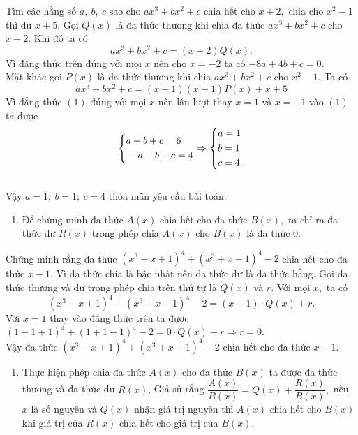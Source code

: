 \begin{vd} %
	Tìm các hằng số $a,\ b,\ c$ sao cho $ax^3+bx^2+c$ chia hết cho $x+2,$ chia cho $x^2-1$ thì dư $x+5.$
	\loigiai
	{
Gọi $Q(x)$ là đa thức thương khi chia đa thức $ax^3+bx^2+c$ cho $x+2.$ Khi đó ta có
\[ax^3+bx^2+c=(x+2)Q(x).\] Vì đẳng thức trên đúng với mọi $x$ nên cho $x=-2$ ta có $-8a+4b+c=0.$\\
Mặt khác gọi $P(x)$ là đa thức thương khi chia $ax^3+bx^2+c$ cho $x^2-1.$ Ta có \[ax^3+bx^2+c=(x+1)(x-1)P(x)+x+5\tag{1} \] Vì đẳng thức $(1)$ đúng với mọi $x$ nên lần lượt thay $x=1$ và $x=-1$ vào $(1)$ ta được \[\left\{\begin{aligned}&a+b+c=6\\&-a+b+c=4\end{aligned}\right.\Rightarrow\left\{\begin{aligned}&a=1\\&b=1\\&c=4.\end{aligned}\right.\]\\ Vậy $a=1;\ b=1;\ c=4$ thỏa mãn yêu cầu bài toán.
}
	\end{vd}
\begin{dang}
	\begin{enumerate}[\tickEX]
		\item Để chứng minh đa thức $A(x)$ chia hết cho đa thức $B(x),$ ta chỉ ra đa thức dư $R(x)$  trong phép chia $A(x)$ cho $B(x)$ là đa thức $0.$
	\end{enumerate}
\end{dang}
\begin{vd}  %
	Chứng minh rằng đa thức $(x^3-x+1)^4+(x^3+x-1)^4-2$ chia hết cho đa thức $x-1.$
	\loigiai
	{
	Vì đa thức chia là bậc nhất nên đa thức dư là đa thức hằng. Gọi đa thức thương và dư trong phép chia trên thứ tự là $Q(x)$ và $r.$ Với mọi $x,$ ta có 
	\[(x^3-x+1)^4+(x^3+x-1)^4-2=(x-1)\cdot Q(x)+r.\]
	Với $x=1$ thay vào đẳng thức trên ta được $(1-1+1)^4+(1+1-1)^4-2=0\cdot Q(x)+r\Rightarrow r=0.$\\
	Vậy đa thức $(x^3-x+1)^4+(x^3+x-1)^4-2$ chia hết cho đa thức $x-1.$
}
	\end{vd}
\begin{dang}
	\begin{enumerate}[\tickEX]
		\item Thực hiện phép chia đa thức $A(x)$ cho đa thức $B(x)$ ta được đa thức thương và đa thức dư $R(x).$ Giả sử rẳng $\dfrac{A(x)}{B(x)}=Q(x)+\dfrac{R(x)}{B(x)},$ nếu $x$ là số nguyên và $Q(x)$ nhận giá trị nguyên thì $A(x)$ chia hết cho $B(x)$ khi giá trị của $R(x)$ chia hết cho giá trị của $B(x).$  
	\end{enumerate}
\end{dang}
